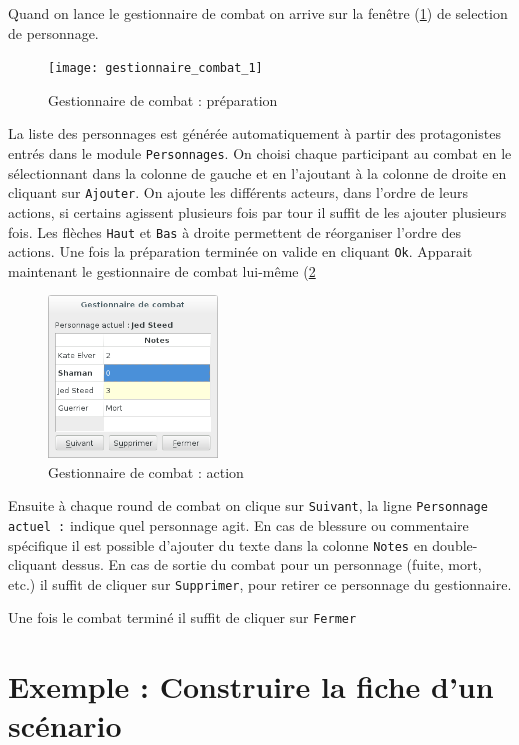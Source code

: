 \documentclass[a4paper,12pt]{article}
\newcommand*{\interfaceitem}[1]{\texttt{#1}}
\begin{document}
Quand on lance le gestionnaire de combat on arrive sur la fenêtre (\ref{gestion_combat_choix}) de selection de personnage.
\begin{figure}[h]
    \texttt{[image: gestionnaire\_combat\_1]}
    \caption{Gestionnaire de combat : préparation}
    \label{gestion_combat_choix}
\end{figure}
La liste des personnages est générée automatiquement à partir des protagonistes entrés dans le module \interfaceitem{Personnages}.
On choisi chaque participant au combat en le sélectionnant dans la colonne de gauche et en l'ajoutant à la colonne de droite en cliquant sur \interfaceitem{Ajouter}.
On ajoute les différents acteurs, dans l’ordre de leurs actions, si certains
agissent plusieurs fois par tour il suffit de les ajouter plusieurs fois. Les flèches \interfaceitem{Haut} et \interfaceitem{Bas} à droite permettent de réorganiser l’ordre des actions.
Une fois la préparation terminée on valide en cliquant \interfaceitem{Ok}.
Apparait maintenant le gestionnaire de combat lui-même (\ref{gestion_combat_fight}
\begin{figure}[h]
    \includegraphics[width=0.4\textwidth]{gestion_combat_fight}
    \caption{Gestionnaire de combat : action}
    \label{gestion_combat_fight}
\end{figure}
Ensuite à chaque round de combat on clique sur \interfaceitem{Suivant}, la ligne \interfaceitem{Personnage actuel :} indique quel personnage agit. En cas de blessure ou commentaire spécifique il est possible d'ajouter du texte dans la colonne \interfaceitem{Notes} en double-cliquant dessus.
En cas de sortie du combat pour un personnage (fuite, mort, etc.) il suffit de cliquer sur \interfaceitem{Supprimer}, pour retirer ce personnage du gestionnaire.

Une fois le combat terminé il suffit de cliquer sur \interfaceitem{Fermer}

\section{Exemple : Construire la fiche d'un scénario}
\label{sec:exem}
\end{document}
